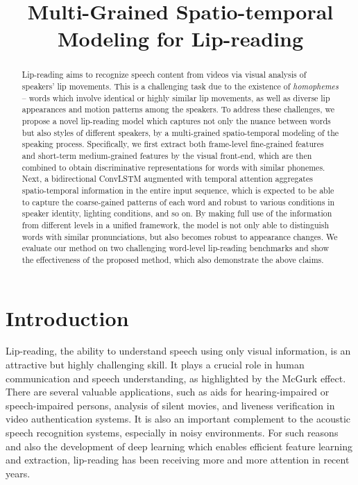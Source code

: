 \documentclass{bmvc2k}
\title{Multi-Grained Spatio-temporal Modeling for Lip-reading}
\begin{document}
\maketitle

\begin{abstract}
Lip-reading aims to recognize speech content from videos via visual analysis of speakers' lip movements. This is a challenging task due to the existence of \textit{homophemes} -- words which involve identical or highly similar lip movements, as well as diverse lip appearances and motion patterns among the speakers. To address these challenges, we propose a novel lip-reading model which captures not only the nuance between words but also styles of different speakers, by a multi-grained spatio-temporal modeling of the speaking process.
Specifically, we first extract both frame-level fine-grained features and short-term medium-grained features by the visual front-end, which are 
then combined to obtain discriminative representations for words with similar phonemes. Next, a bidirectional ConvLSTM augmented with temporal attention aggregates spatio-temporal information in the entire input sequence, which is expected to be able to capture the coarse-gained patterns of each word and robust to various conditions in speaker identity, lighting conditions, and so on. By making full use of the information from different levels in a unified framework, the model is not only able to distinguish words with similar pronunciations, but also becomes robust to appearance changes. We evaluate our method on two challenging word-level lip-reading benchmarks and show the effectiveness of the proposed method, which also demonstrate the above claims. 
\end{abstract}

\section{Introduction}
\label{sec:intro}

Lip-reading, the ability to understand speech using only visual information, is an attractive but highly challenging skill. It plays a crucial role in human communication and speech understanding, as highlighted by the McGurk effect. There are several valuable applications, such as aids for hearing-impaired or speech-impaired persons, analysis of silent movies, and liveness verification in video authentication systems. It is also an important complement to the acoustic speech recognition systems, especially in noisy environments. For such reasons and also the development of deep learning which enables efficient feature learning and extraction, lip-reading has been receiving more and more attention in recent years.
\end{document}
